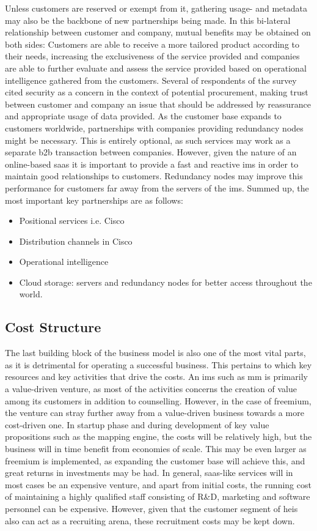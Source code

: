 Unless customers are reserved or exempt from it, gathering usage- and metadata may also be the backbone of new partnerships being made. In this bi-lateral relationship between customer and company, mutual benefits may be obtained on both sides: Customers are able to receive a more tailored product according to their needs, increasing the exclusiveness of the service provided and companies are able to further evaluate and assess the service provided based on operational intelligence gathered from the customers. Several of respondents of the survey cited security as a concern in the context of potential procurement, making trust between customer and company an issue that should be addressed by reassurance and appropriate usage of data provided. As the customer base expands to customers worldwide, partnerships with companies providing redundancy nodes might be necessary. This is entirely optional, as such services may work as a separate \gls{b2b} transaction between companies. However, given the nature of an online-based \gls{saas} it is important to provide a fast and reactive \gls{ims} in order to maintain good relationships to customers. Redundancy nodes may improve this performance for customers far away from the servers of the \gls{ims}. Summed up, the most important key partnerships are as follows: 


\begin{itemize}
    \item Positional services i.e. Cisco
    \item Distribution channels in Cisco
    \item Operational intelligence
    \item Cloud storage: servers and redundancy nodes for better access throughout the world.
\end{itemize}

\subsection{Cost Structure}
The last building block of the business model is also one of the most vital parts, as it is detrimental for operating a successful business. This pertains to which key resources and key activities that drive the costs. An \gls{ims} such as \gls{mm} is primarily a value-driven venture, as most of the activities concerns the creation of value among its customers in addition to counselling. However, in the case of freemium, the venture can stray further away from a value-driven business towards a more cost-driven one. In startup phase and during development of key value propositions such as the mapping engine, the costs will be relatively high, but the business will in time benefit from economies of scale. This may be even larger as freemium is implemented, as expanding the customer base will achieve this, and great returns in investments may be had. In general, \gls{saas}-like services will in most cases be an expensive venture, and apart from initial costs, the running cost of maintaining a highly qualified staff consisting of R\&D, marketing and software personnel can be expensive. However, given that the customer segment of \glspl{hei} also can act as a recruiting arena, these recruitment costs may be kept down.  


